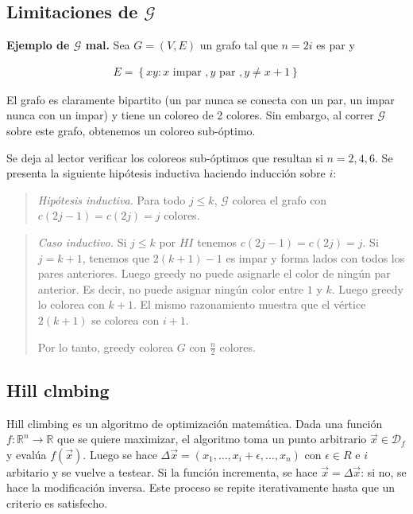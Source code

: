 \documentclass[a4paper]{article}
\begin{document}
\pagebreak

\subsection{Limitaciones de $\mathscr{G}$}


\textbf{Ejemplo de $\mathscr{G}$ mal.} Sea $G = (V, E)$ un grafo tal que $n = 2i$ es par
y 

\begin{align*}
    E = \left\{ xy : x \text{ impar }, y \text{ par }, y \neq x + 1\right\} 
\end{align*}

El grafo es claramente bipartito (un par nunca se conecta con un par, un impar
nunca con un impar) y tiene un coloreo de 2 colores. Sin embargo, al correr
$\mathscr{G}$ sobre este grafo, obtenemos un coloreo sub-óptimo.

Se deja al lector verificar los coloreos sub-óptimos que resultan si $n = 2, 4,
6$. Se presenta la siguiente hipótesis inductiva haciendo inducción sobre $i$:


\small
\begin{quote}

\textit{Hipótesis inductiva}. Para todo $j \leq k$, $\mathscr{G}$ colorea el grafo con
$c(2j - 1) = c(2j) = j$ colores.

\end{quote}
\normalsize

\small
\begin{quote}

    \textit{Caso inductivo.} Si $j \leq k$ por $HI$ tenemos $c(2j - 1) = c(2j) =
    j$. Si $j = k + 1$, tenemos que $2(k+1) - 1$ es impar y forma lados con
    todos los pares anteriores. Luego greedy no puede asignarle el color de
    ningún par anterior. Es decir, no puede asignar ningún color entre $1$ y
    $k$. Luego greedy lo colorea con $k + 1$. El mismo razonamiento muestra que
    el vértice $2(k+1)$ se colorea con $i + 1$.

    Por lo tanto, greedy colorea $G$ con $\frac{n}{2}$ colores.


\end{quote}
\normalsize


\subsection{Hill clmbing}

Hill climbing es un algoritmo de optimización matemática. Dada una función $f :
\mathbb{R}^n \to \mathbb{R}$ que se quiere maximizar, el algoritmo toma un punto
arbitrario
$\vec{x} \in \mathcal{D}_f$ y evalúa $f(\vec{x})$. Luego se hace $\Delta\vec{x} =
(x_1, \ldots, x_{i} + \epsilon, \ldots, x_n)$ con $\epsilon \in R$ e $i$
arbitario y se vuelve a testear. Si la función incrementa, se hace
$\vec{x} = \Delta\vec{x}$: si no, se hace la modificación inversa. Este proceso
se repite iterativamente hasta que un criterio es satisfecho.
\end{document}
